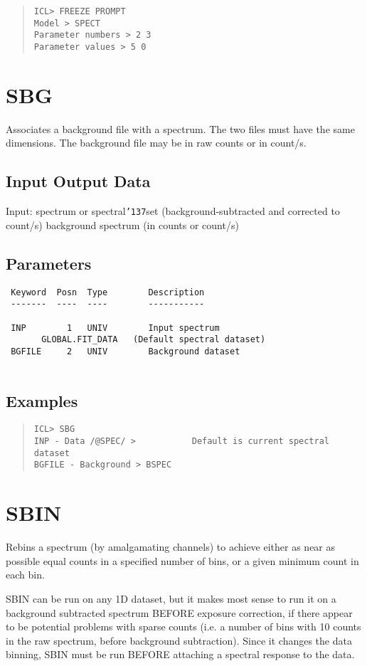 \documentclass{book}
\renewcommand{\_}{{\tt\char'137}}     %
\begin{document}
\begin{quote}\begin{verbatim}
ICL> FREEZE PROMPT
Model > SPECT
Parameter numbers > 2 3
Parameter values > 5 0
\end{verbatim}\end{quote}
\section{SBG}
Associates a background file with a spectrum.
The two files must have the same dimensions. The background file
may be in raw counts or in count/s.
 
\subsection{Input Output Data}
Input: spectrum or spectral\_set (background-subtracted and corrected
to count/s)
background spectrum (in counts or count/s)
\subsection{Parameters}
\begin{verbatim}
 Keyword  Posn  Type        Description
 -------  ----  ----        -----------
 
 INP        1   UNIV        Input spectrum
       GLOBAL.FIT_DATA   (Default spectral dataset)
 BGFILE     2   UNIV        Background dataset
 
\end{verbatim}\subsection{Examples}
\begin{quote}\begin{verbatim}
ICL> SBG
INP - Data /@SPEC/ >           Default is current spectral dataset
BGFILE - Background > BSPEC
\end{verbatim}\end{quote}
\section{SBIN}
Rebins a spectrum (by amalgamating channels) to achieve either as
near as possible equal counts in a specified number of bins, or a
given minimum count in each bin.
 
SBIN can be run on any 1D dataset, but it makes most sense to
run it on a background subtracted spectrum BEFORE exposure
correction, if there appear to be potential problems with
sparse counts (i.e. a number of bins with 10 counts in the
raw spectrum, before background subtraction). Since it changes
the data binning, SBIN must be run BEFORE attaching a spectral
response to the data.
 
\end{document}
